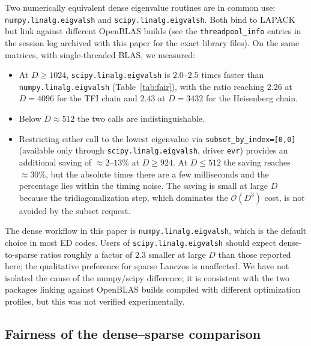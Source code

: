 \documentclass[pdflatex,sn-mathphys-num]{sn-jnl}
\begin{document}
Two numerically equivalent dense eigenvalue routines are in common
use: \texttt{numpy.linalg.eigvalsh} and \texttt{scipy.linalg.eigvalsh}.
Both bind to LAPACK but link against different OpenBLAS builds
(see the \texttt{threadpool\_info} entries in the session log
archived with this paper for the exact library files). On the same
matrices, with single-threaded BLAS, we measured:

\begin{itemize}
  \item At $D \geq 1024$, \texttt{scipy.linalg.eigvalsh} is
        $2.0$--$2.5$ times faster than \texttt{numpy.linalg.eigvalsh}
        (Table~\ref{tab:fair}), with the ratio reaching $2.26$ at
        $D = 4096$ for the TFI chain and $2.43$ at $D = 3432$ for the
        Heisenberg chain.
  \item Below $D \approx 512$ the two calls are indistinguishable.
  \item Restricting either call to the lowest eigenvalue via
        \texttt{subset\_by\_index=[0,0]} (available only through
        \texttt{scipy.linalg.eigvalsh}, driver \texttt{evr}) provides
        an additional saving of $\approx 2$--$13\%$ at $D \geq 924$.
        At $D \leq 512$ the saving reaches $\approx 30\%$, but the
        absolute times there are a few milliseconds and the
        percentage lies within the timing noise. The saving is small
        at large $D$ because the tridiagonalization step, which
        dominates the $\mathcal{O}(D^3)$ cost, is not avoided by the
        subset request.
\end{itemize}

The dense workflow in this paper is \texttt{numpy.linalg.eigvalsh},
which is the default choice in most ED codes. Users of
\texttt{scipy.linalg.eigvalsh} should expect dense-to-sparse ratios
roughly a factor of $2.3$ smaller at large $D$ than those reported
here; the qualitative preference for sparse Lanczos is unaffected.
We have not isolated the cause of the numpy/scipy difference; it is
consistent with the two packages linking against OpenBLAS builds
compiled with different optimization profiles, but this was not
verified experimentally.

\subsection{Fairness of the dense--sparse comparison}
\label{sec:fairness}
\end{document}
